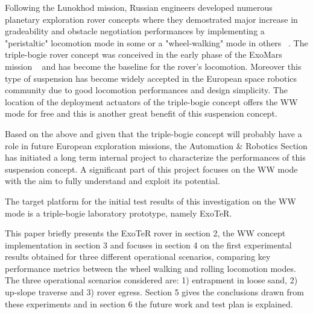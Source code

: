 \documentclass[a4paper,twocolumn]{esapub2005} %
\begin{document}
Following the Lunokhod mission, Russian engineers developed numerous planetary
exploration rover concepts where they demostrated major increase in
gradeability and obstacle negotiation performances by implementing a
"peristaltic" locomotion mode in some or a "wheel-walking" mode in others
~\cite{Ehrenfreund1998}. The triple-bogie rover concept was conceived in the
early phase of the ExoMars mission ~\cite{Patel2010} and has become the
baseline for the rover's locomotion. Moreover this type of suspension has
become widely accepted in the European space robotics community due to good
locomotion performances and design simplicity. The location of the deployment
actuators of the triple-bogie concept offers the WW mode for free and this is
another great benefit of this suspension concept.

Based on the above and given that the triple-bogie concept will probably have a
role in future European exploration missions, the Automation \& Robotics
Section has initiated a long term internal project to characterize the
performances of this suspension concept. A significant part of this project
focuses on the WW mode with the aim to fully understand and exploit its
potential.

The target platform for the initial test results of this investigation on the
WW mode is a triple-bogie laboratory prototype, namely ExoTeR. 

%

This paper briefly presents the ExoTeR rover in section 2, the WW
concept implementation in section 3 and focuses in
section 4 on the first experimental results obtained for three different
operational scenarios, comparing key performance metrics between the wheel
walking and rolling locomotion modes. The three operational scenarios
considered are: 1) entrapment in loose sand, 2) up-slope traverse and 3) rover
egress. Section 5 gives the conclusions drawn from these experiments and in
section 6 the future work and test plan is explained.
\end{document}
